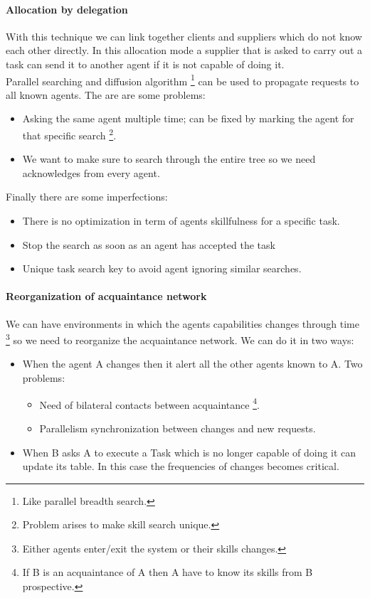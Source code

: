 \documentclass[10pt,a4paper]{article}
\begin{document}
\paragraph{Allocation by delegation}
With this technique we can link together clients and suppliers which do not know each other directly. In this allocation mode a supplier that is asked to carry out a task can send it to another agent if it is not capable of doing it.\\
Parallel searching and diffusion algorithm \footnote{Like parallel breadth search.} can be used to propagate requests to all known agents. The are are some problems:
\begin{itemize}
\item Asking the same agent multiple time; can be fixed by marking the agent for that specific search \footnote{Problem arises to make skill search unique.}.
\item We want to make sure to search through the entire tree so we need acknowledges from every agent.
\end{itemize}  



Finally there are some imperfections:
\begin{itemize}
\item There is no optimization in term of agents skillfulness for a specific task.
\item Stop the search as soon as an agent has accepted the task
\item Unique task search key to avoid agent ignoring similar searches.
\end{itemize}


\paragraph{Reorganization of acquaintance network}

We can have environments in which the agents capabilities changes through time \footnote{Either agents enter/exit the system or their skills changes.} so we need to reorganize the acquaintance network. We can do it in two ways:
\begin{itemize}
\item When the agent A changes then it alert all the other agents known to A. Two problems:
	\begin{itemize}
	\item Need of bilateral contacts between acquaintance \footnote{If B is an acquaintance of A then A have to know its skills from B prospective.}.
	\item Parallelism synchronization between changes and new requests.
	\end{itemize}
\item When B asks A to execute a Task which is no longer capable of doing it can update its table. In this case the frequencies of changes becomes critical.
\end{itemize}
\end{document}
